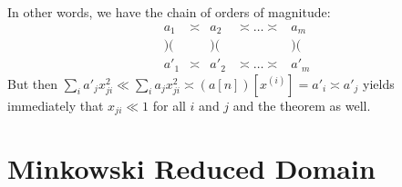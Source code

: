In other words, we have the chain of orders of magnitude:
$$
\begin{matrix}
a_{1} & \asymp & a_{2}  & \asymp\ldots\asymp & a_{m}\\
)( & & )( & & )(\\
a'_{1} & \asymp & a'_{2} & \asymp\ldots\asymp & a'_{m}
\end{matrix}
$$
But then $\sum\limits_{i}a'_{j}x^{2}_{ji}\ll
\sum\limits_{i}a_{j}x^{2}_{ji}\asymp (a[n])[x^{(i)}]=a'_{i}\asymp
a'_{j}$ yields immediately that $x_{ji}\ll 1$ for all $i$ and $j$ and
the theorem as well. 


\section{Minkowski Reduced Domain}\label{c1:sec-1.3}\pageoriginale

